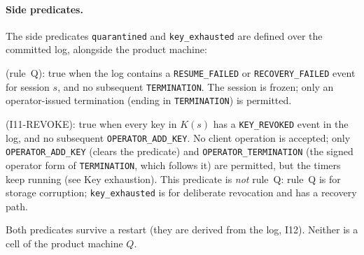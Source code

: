 \paragraph{Side predicates.}
The side predicates \texttt{quarantined} and \texttt{key\_exhausted} are
defined over the committed log, alongside the product machine:
\begin{description}[leftmargin=2em]
\item[\texttt{quarantined}$(s)$] (rule~Q): true when the log
contains a \texttt{RESUME\_FAILED} or \texttt{RECOVERY\_FAILED}
event for session $s$, and no subsequent \texttt{TERMINATION}. The
session is frozen; only an operator-issued termination (ending in
\texttt{TERMINATION}) is permitted.
\item[\texttt{key\_exhausted}$(s)$] (I11-REVOKE): true when every
key in $K(s)$ has a \texttt{KEY\_REVOKED} event in the log, and no
subsequent \texttt{OPERATOR\_ADD\_KEY}. No client operation is
accepted; only \texttt{OPERATOR\_ADD\_KEY} (clears the predicate) and
\texttt{OPERATOR\_TERMINATION} (the signed operator form of
\texttt{TERMINATION}, which follows it) are permitted, but the timers keep
running (see Key exhaustion). This predicate is
\emph{not} rule~Q: rule~Q is for storage corruption;
\texttt{key\_exhausted} is for deliberate revocation and has a
recovery path.
\end{description}
Both predicates survive a restart (they are derived from the log,
I12). Neither is a cell of the product machine $Q$.


